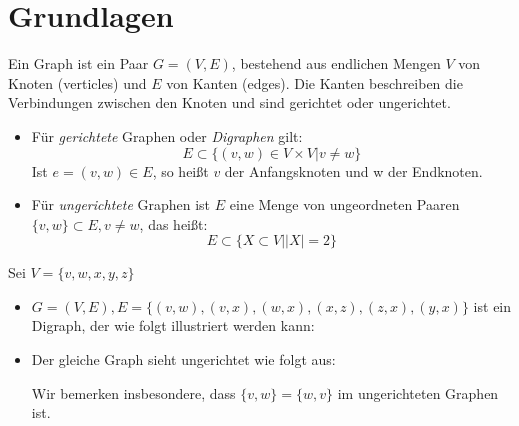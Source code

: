 \section{Grundlagen}
\begin{definition}[Graph]
	Ein Graph ist ein Paar $G=(V,E)$, bestehend aus endlichen Mengen $V$ von Knoten (verticles) und $E$ von Kanten (edges).
	Die Kanten beschreiben die Verbindungen zwischen den Knoten und sind gerichtet oder ungerichtet.
	\begin{itemize}
		\item Für \emph{gerichtete} Graphen oder \emph{Digraphen} gilt:
			\[
			E \subset \{(v,w) \in V \times V |v \neq w\} 
			\]
		Ist $e=(v,w) \in  E$, so heißt $v$ der Anfangsknoten und w der Endknoten.
	\item Für \emph{ungerichtete} Graphen ist $E$ eine Menge von ungeordneten Paaren $\{v,w\}\subset E, v\neq w $, das heißt:
		\[
		E \subset \{X \subset V | |X|=2\} 
		\]
	\end{itemize}
\end{definition}
\begin{example}
	\label{eg:graph1}
Sei $V=\{v,w,x,y,z\}$
\begin{itemize}
	\item $G=(V,E), E=\{(v,w),(v,x),(w,x),(x,z),(z,x),(y,x)\}$ ist ein Digraph, der wie folgt illustriert werden kann:
	\begin{center}	
    \end{center}
  \item Der gleiche Graph sieht ungerichtet wie folgt aus:
	          \begin{center}
    \end{center}
Wir bemerken insbesondere, dass $\{v,w\}=\{w,v\}$ im ungerichteten Graphen ist.
\end{itemize}
\end{example}
